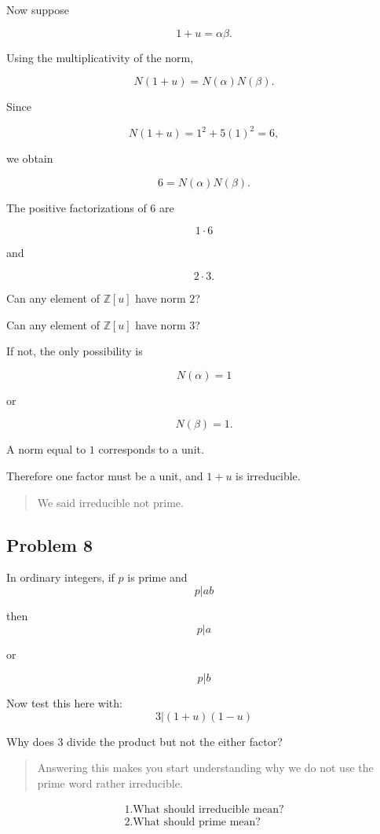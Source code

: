 Now suppose

\[
1+u=\alpha\beta.
\]

Using the multiplicativity of the norm,

\[
N(1+u)
=
N(\alpha)N(\beta).
\]

Since

\[
N(1+u)
=
1^2+5(1)^2
=
6,
\]

we obtain

\[
6=N(\alpha)N(\beta).
\]

The positive factorizations of \(6\) are

\[
1\cdot6
\]

and

\[
2\cdot3.
\]

Can any element of \(\mathbb Z[u]\) have norm \(2\)?

Can any element of \(\mathbb Z[u]\) have norm \(3\)?

If not, the only possibility is

\[
N(\alpha)=1
\]

or

\[
N(\beta)=1.
\]

A norm equal to \(1\) corresponds to a unit.

Therefore one factor must be a unit, and \(1+u\) is irreducible.

\begin{quote}
    We said irreducible not prime.
\end{quote}


\subsection{Problem 8}
In ordinary integers, if $\textit{p}$ is prime and
    \[p|ab\]

then
    \[p|a\]

or

    \[p|b\]

Now test this here with:
    \[3|(1+u)(1-u)\]

Why does 3 divide the product but not the either factor?

\begin{quote}
    Answering this makes you start understanding why we do not use the prime word rather 
    irreducible.
\end{quote}

    \begin{align*}
        1. \text{What should irreducible mean?} \\
        2. \text{What should prime mean?  }      
    \end{align*}

